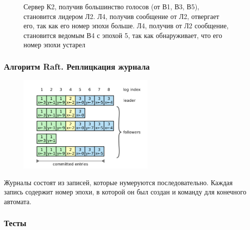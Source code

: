 \documentclass[pdf, 10pt, unicode,aspectratio=169]{beamer} %
\begin{document}
\begin{frame}
\begin{figure}[H]
\begin{minipage}[h]{0.49\linewidth}
\begin{small}
Сервер К2, получив большинство голосов (от В1, В3, В5), становится лидером Л2. Л4, получив сообщение от Л2, отвергает его, так как его номер эпохи больше. Л4, получив от Л2 сообщение,
становится ведомым В4 с эпохой 5, так как обнаруживает, что его номер эпохи устарел \\
\end{small}
\end{minipage}
\end{figure}

\end{frame}


\begin{frame}
\frametitle{Алгоритм Raft. Реплицкация журнала}

\begin{figure}
\vspace{-60pt}
\includegraphics[width=0.6\textwidth]{log_1.png}
\end{figure}

Журналы состоят из записей, которые нумеруются последовательно. Каждая запись содержит номер эпохи, в которой он был создан и команду для конечного автомата.

\end{frame}


\begin{frame}
\frametitle{Тесты}


\end{frame}
\end{document}
